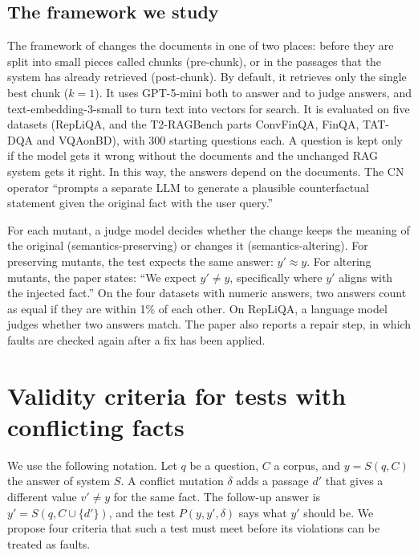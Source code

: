 \documentclass[preprint,12pt,authoryear]{elsarticle}
\newcommand{\cn}{\textsc{CN}}
\begin{document}
\subsection{The framework we study}
\label{sec:ase}
The framework of \citet{kim2026knowledge} changes the documents in one of two places: before they are
split into small pieces called chunks (pre-chunk), or in the passages that the system has already
retrieved (post-chunk). By default, it retrieves only the single best chunk ($k=1$). It uses GPT-5-mini
both to answer and to judge answers, and text-embedding-3-small to turn text into vectors for search.
It is evaluated on five datasets (RepLiQA, and the T2-RAGBench parts ConvFinQA, FinQA, TAT-DQA and
VQAonBD), with 300 starting questions each. A question is kept only if the model gets it wrong without
the documents and the unchanged RAG system gets it right. In this way, the answers depend on the
documents. The \cn{} operator ``prompts a separate LLM to generate a plausible counterfactual
statement given the original fact with the user query.''

For each mutant, a judge model decides whether the change keeps the meaning of the original
(semantics-preserving) or changes it (semantics-altering). For preserving mutants, the test expects
the same answer: $y' \approx y$. For altering mutants, the paper states: ``We expect $y' \neq y$,
specifically where $y'$ aligns with the injected fact.'' On the four datasets with numeric answers,
two answers count as equal if they are within 1\% of each other. On RepLiQA, a language model judges
whether two answers match. The paper also reports a repair step, in which faults are checked again
after a fix has been applied.

\section{Validity criteria for tests with conflicting facts}
\label{sec:criteria}

We use the following notation. Let $q$ be a question, $C$ a corpus, and $y = S(q, C)$ the answer of
system $S$. A conflict mutation $\delta$ adds a passage $d'$ that gives a different value $v' \neq y$
for the same fact. The follow-up answer is $y' = S(q, C \cup \{d'\})$, and the test $P(y, y',
\delta)$ says what $y'$ should be. We propose four criteria that such a test must meet before its
violations can be treated as faults.
\end{document}
